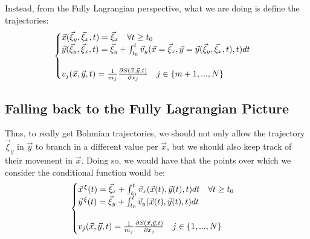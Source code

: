 \documentclass[11pt, a4paper]{article} %
\DeclareRobustCommand{\mybox}[2][gray!10]{%
\begin{tcolorbox}[   %
        left=0.2cm,
        right=0.2cm,
        top=0.15cm,
        bottom=0.15cm,
        colback=#1,
        colframe=#1,
        width=\dimexpr\textwidth\relax, 
        enlarge left by=0mm,
        boxsep=5pt,
        arc=0pt,outer arc=0pt,
        ]
        #2
\end{tcolorbox}
}
\begin{document}
\mybox{
Instead, from the Fully Lagrangian perspective, what we are doing is define the trajectories:
\begin{equation}\label{a}
\begin{cases}
\vec{x}(\vec{\xi}_y, \vec{\xi}_x,t)=\vec{\xi}_x \quad \forall t\geq t_0\\
\vec{y}(\vec{\xi}_y, \vec{\xi}_x,t)=\vec{\xi}_y+\int_{t_0}^t \vec{v}_y(\vec{x}=\vec{\xi}_x, \vec{y}=\vec{y}(\vec{\xi}_y, \vec{\xi}_x,t),t)dt\\ \\
v_j(\vec{x}, \vec{y},t)=\frac{1}{m_j}\pdv{S(\vec{x}, \vec{y},t)}{x_j}\quad j\in\{m+1,...,N \}
\end{cases}
\end{equation}


\subsection*{Falling back to the Fully Lagrangian Picture}
Thus, to really get Bohmian trajectories, we should not only allow the trajectory $\vec{\xi}_y$ in $\vec{y}$ to branch in a different value per $\vec{x}$, but we should also keep track of their movement in $\vec{x}$. Doing so, we would have that the points over which we consider the conditional function would be:
\begin{equation}
\begin{cases}\label{b}
\vec{x}^{\, \xi}(t)=\vec{\xi}_x +\int_{t_0}^t \vec{v}_x(\vec{x}(t), \vec{y}(t),t)dt\quad \forall t\geq t_0\\
\vec{y}^{\, \xi}(t)=\vec{\xi}_y+\int_{t_0}^t \vec{v}_y(\vec{x}(t), \vec{y}(t),t)dt\\ \\
v_j(\vec{x}, \vec{y},t)=\frac{1}{m_j}\pdv{S(\vec{x}, \vec{y},t)}{x_j}\quad j\in\{1,...,N \}
\end{cases}
\end{equation}


}
\end{document}

